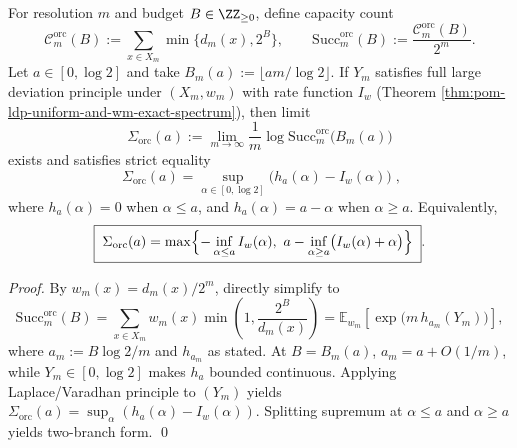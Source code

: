 \begin{theorem}\label{thm:pom-oracle-success-variational-laplace}
For resolution \(m\) and budget \(B\in\ZZ_{\ge 0}\), define capacity count
\[
\mathcal{C}^{\mathrm{orc}}_m(B):=\sum_{x\in X_m}\min\{d_m(x),2^B\},
\qquad
\mathrm{Succ}^{\mathrm{orc}}_m(B):=\frac{\mathcal{C}^{\mathrm{orc}}_m(B)}{2^m}.
\]
Let \(a\in[0,\log 2]\) and take \(B_m(a):=\lfloor a m/\log 2\rfloor\).
If \(Y_m\) satisfies full large deviation principle under \((X_m,w_m)\) with rate function \(I_w\) (Theorem \ref{thm:pom-ldp-uniform-and-wm-exact-spectrum}), then limit
\[
\Sigma_{\mathrm{orc}}(a):=\lim_{m\to\infty}\frac{1}{m}\log \mathrm{Succ}^{\mathrm{orc}}_m\bigl(B_m(a)\bigr)
\]
exists and satisfies strict equality
\[
\boxed{\;
\Sigma_{\mathrm{orc}}(a)=\sup_{\alpha\in[0,\log 2]}\bigl(h_a(\alpha)-I_w(\alpha)\bigr)\;},
\]
where \(h_a(\alpha)=0\) when \(\alpha\le a\), and \(h_a(\alpha)=a-\alpha\) when \(\alpha\ge a\).
Equivalently,
\[
\boxed{\;
\Sigma_{\mathrm{orc}}(a)=
\max\Bigl\{-\inf_{\alpha\le a}I_w(\alpha),\ a-\inf_{\alpha\ge a}\bigl(I_w(\alpha)+\alpha\bigr)\Bigr\}\; } .
\]
\end{theorem}
\begin{proof}
By \(w_m(x)=d_m(x)/2^m\), directly simplify to
\[
\mathrm{Succ}^{\mathrm{orc}}_m(B)
=\sum_{x\in X_m}w_m(x)\min\!\left(1,\frac{2^B}{d_m(x)}\right)
=\mathbb{E}_{w_m}\!\left[\exp\!\bigl(m\,h_{a_m}(Y_m)\bigr)\right],
\]
where \(a_m:=B\log 2/m\) and \(h_{a_m}\) as stated.
At \(B=B_m(a)\), \(a_m=a+O(1/m)\), while \(Y_m\in[0,\log 2]\) makes \(h_a\) bounded continuous.
Applying Laplace/Varadhan principle to \((Y_m)\) yields
\(
\Sigma_{\mathrm{orc}}(a)=\sup_\alpha(h_a(\alpha)-I_w(\alpha))
\).
Splitting supremum at \(\alpha\le a\) and \(\alpha\ge a\) yields two-branch form. \qed
\end{proof}

